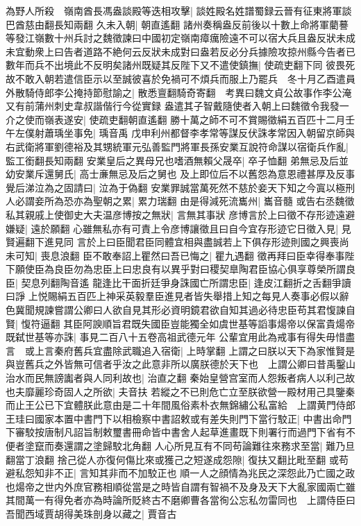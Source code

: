 為野人所殺　嶺南酋長馮盎談殿等迭相攻擊|{
	談姓殿名姓譜蜀録云晉有征東將軍談巴酋慈由翻長知兩翻}
久未入朝|{
	朝直遙翻}
諸州奏稱盎反前後以十數上命將軍藺謩等發江嶺數十州兵討之魏徵諫曰中國初定嶺南瘴癘險遠不可以宿大兵且盎反狀未成未宜動衆上曰告者道路不絶何云反狀未成對曰盎若反必分兵據險攻掠州縣今告者已數年而兵不出境此不反明矣諸州既疑其反陛下又不遣使鎮撫|{
	使疏吏翻下同}
彼畏死故不敢入朝若遣信臣示以至誠彼喜於免禍可不煩兵而服上乃罷兵　冬十月乙酉遣員外散騎侍郎李公掩持節慰諭之|{
	散悉亶翻騎奇寄翻　考異曰魏文貞公故事作李公淹又有前蒲州刺史韋叔諧偕行今從實録}
盎遣其子智戴隨使者入朝上曰魏徵令我發一介之使而嶺表遂安|{
	使疏吏翻朝直遙翻}
勝十萬之師不可不賞賜徵絹五百匹十二月壬午左僕射蕭瑀坐事免|{
	瑀音禹}
戊申利州都督李孝常等謀反伏誅孝常因入朝留京師與右武衛將軍劉德裕及其甥統軍元弘善監門將軍長孫安業互說符命謀以宿衛兵作亂|{
	監工銜翻長知兩翻}
安業皇后之異母兄也嗜酒無賴父晟卒|{
	卒子恤翻}
弟無忌及后並幼安業斥還舅氏|{
	高士亷無忌及后之舅也}
及上即位后不以舊怨為意恩禮甚厚及反事覺后涕泣為之固請曰|{
	泣為于偽翻}
安業罪誠當萬死然不慈於妾天下知之今寘以極刑人必謂妾所為恐亦為聖朝之累|{
	累力瑞翻}
由是得減死流巂州|{
	巂音髓}
或告右丞魏徵私其親戚上使御史大夫温彦博按之無狀|{
	言無其事狀}
彦博言於上曰徵不存形迹遠避嫌疑|{
	遠於願翻}
心雖無私亦有可責上令彦博讓徵且曰自今宜存形迹它日徵入見|{
	見賢遍翻下進見同}
言於上曰臣聞君臣同體宜相與盡誠若上下俱存形迹則國之興喪尚未可知|{
	喪息浪翻}
臣不敢奉詔上瞿然曰吾已悔之|{
	瞿九遇翻}
徵再拜曰臣幸得奉事陛下願使臣為良臣勿為忠臣上曰忠良有以異乎對曰稷契臯陶君臣協心俱享尊榮所謂良臣|{
	契息列翻陶音遙}
龍逢比干面折廷爭身誅國亡所謂忠臣|{
	逢皮江翻折之舌翻爭讀曰諍}
上悦賜絹五百匹上神采英毅羣臣進見者皆失舉措上知之每見人奏事必假以辭色冀聞規諫嘗謂公卿曰人欲自見其形必資明鏡君欲自知其過必待忠臣苟其君愎諫自賢|{
	愎符逼翻}
其臣阿諛順旨君既失國臣豈能獨全如虞世基等謟事煬帝以保富貴煬帝既弑世基等亦誅|{
	事見二百八十五卷高祖武德元年}
公輩宜用此為戒事有得失毋惜盡言　或上言秦府舊兵宜盡除武職追入宿衛|{
	上時掌翻}
上謂之曰朕以天下為家惟賢是與豈舊兵之外皆無可信者乎汝之此意非所以廣朕德於天下也　上謂公卿曰昔禹鑿山治水而民無謗讟者與人同利故也|{
	治直之翻}
秦始皇營宫室而人怨叛者病人以利己故也夫靡麗珍奇固人之所欲|{
	夫音扶}
若縱之不已則危亡立至朕欲營一殿材用己具鑒秦而止王公已下宜體朕此意由是二十年間風俗素朴衣無錦繡公私富給　上謂黄門侍郎王珪曰國家本置中書門下以相檢察中書詔敕或有差失則門下當行駮正|{
	中書出命門下審駮按唐制凡詔旨制敕璽書冊命皆中書舍人起草進畫既下則署行而過門下省有不便者塗竄而奏還謂之塗歸駮北角翻}
人心所見互有不同苟論難往來務求至當|{
	難乃旦翻當丁浪翻}
捨己從人亦復何傷比來或獲己之短遂成怨隙|{
	復扶又翻比毗至翻}
或苟避私怨知非不正|{
	言知其非而不加駮正也}
順一人之顔情為兆民之深怨此乃亡國之政也煬帝之世内外庶官務相順從當是之時皆自謂有智禍不及身及天下大亂家國兩亡雖其間萬一有得免者亦為時論所貶終古不磨卿曹各當徇公忘私勿雷同也　上謂侍臣曰吾聞西域賈胡得美珠剖身以藏之|{
	賈音古}
